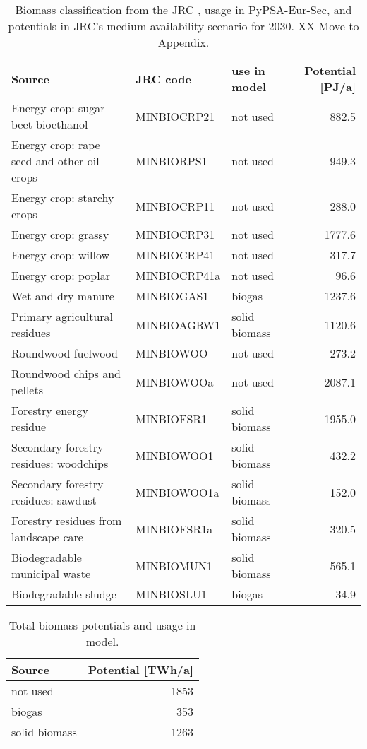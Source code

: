 \begin{table}[t]
    \centering
    \small
    \begin{tabular}{lllr}
      \toprule
      Source & JRC code & use in model & Potential [PJ/a] \\
      \midrule
      Energy crop: sugar beet bioethanol & MINBIOCRP21 & not used & 882.5 \\
      Energy crop: rape seed and other oil crops & MINBIORPS1 & not used & 949.3 \\
      Energy crop: starchy crops & MINBIOCRP11 & not used & 288.0 \\
      Energy crop: grassy & MINBIOCRP31 & not used & 1777.6 \\
      Energy crop: willow & MINBIOCRP41 & not used & 317.7\\
      Energy crop: poplar & MINBIOCRP41a & not used & 96.6 \\
      Wet and dry manure & MINBIOGAS1 & biogas  & 1237.6 \\
      Primary agricultural residues & MINBIOAGRW1 & solid biomass &  1120.6\\
      Roundwood fuelwood & MINBIOWOO & not used & 273.2 \\
      Roundwood chips and pellets & MINBIOWOOa & not used & 2087.1\\
      Forestry energy residue & MINBIOFSR1 & solid biomass & 1955.0 \\
      Secondary forestry residues: woodchips & MINBIOWOO1 & solid biomass & 432.2 \\
      Secondary forestry residues: sawdust & MINBIOWOO1a & solid biomass & 152.0 \\
      Forestry residues from landscape care & MINBIOFSR1a & solid biomass & 320.5\\
      Biodegradable municipal waste  & MINBIOMUN1 & solid biomass & 565.1 \\
      Biodegradable sludge & MINBIOSLU1 & biogas  & 34.9 \\ \bottomrule
    \end{tabular}
    \caption{Biomass classification from the JRC \cite{jrcbiomass2015}, usage in PyPSA-Eur-Sec, and potentials in JRC's medium availability scenario for 2030. XX Move to Appendix.}
    \label{tab:biomass}
  \end{table}


\begin{table}[t]
    \centering
    \small
    \begin{tabular}{lr}
      \toprule
      Source & Potential [TWh/a] \\
      \midrule
      not used & 1853 \\
      biogas & 353 \\
      solid biomass & 1263 \\ \bottomrule
    \end{tabular}
    \caption{Total biomass potentials and usage in model.}
    \label{tab:biomasstwh}
  \end{table}

